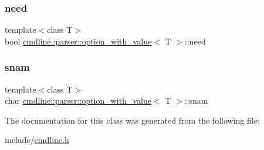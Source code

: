 \subsubsection{\texorpdfstring{need}{need}}
{\footnotesize\ttfamily template$<$class T$>$ \\
bool \mbox{\hyperlink{classcmdline_1_1parser_1_1option__with__value}{cmdline\+::parser\+::option\+\_\+with\+\_\+value}}$<$ T $>$\+::need\hspace{0.3cm}{\ttfamily [protected]}}

\mbox{\label{classcmdline_1_1parser_1_1option__with__value_a176bf293810fe0a9846585da1bef7ae5}} 
\subsubsection{\texorpdfstring{snam}{snam}}
{\footnotesize\ttfamily template$<$class T$>$ \\
char \mbox{\hyperlink{classcmdline_1_1parser_1_1option__with__value}{cmdline\+::parser\+::option\+\_\+with\+\_\+value}}$<$ T $>$\+::snam\hspace{0.3cm}{\ttfamily [protected]}}



The documentation for this class was generated from the following file\+:\begin{DoxyCompactItemize}
\item 
include/\mbox{\hyperlink{cmdline_8h}{cmdline.\+h}}\end{DoxyCompactItemize}
